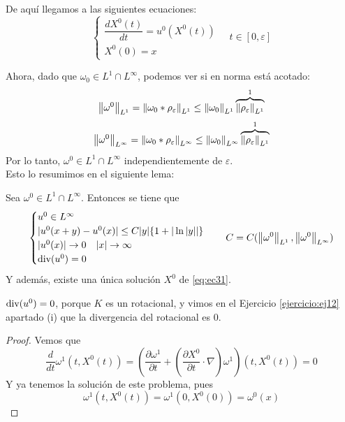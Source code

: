 De aquí llegamos a las siguientes ecuaciones:
\begin{equation}\label{eq:ec31}
    \begin{cases}
        \dfrac{d X^0(t)}{dt} = u^0(X^0(t)) \\
        X^0(0) = x
    \end{cases} \quad t \in [0,\varepsilon]
\end{equation}

Ahora, dado que $\omega_0 \in L^1 \cap L^\infty$, podemos ver si en norma está acotado:
$$\left\lVert \omega^0 \right\rVert_{L^1} = \left\lVert \omega_0 \ast \rho_\varepsilon \right\rVert_{L^1} \leq \left\lVert \omega_0 \right\rVert_{L^1} \overbrace{\left\lVert \rho_\varepsilon \right\rVert_{L^1}}^{1}$$
$$\left\lVert \omega^0 \right\rVert_{L^\infty} = \left\lVert \omega_0 \ast \rho_\varepsilon \right\rVert_{L^\infty} \leq \left\lVert \omega_0 \right\rVert_{L^\infty} 
\overbrace{\left\lVert \rho_\varepsilon \right\rVert_{L^1}}^{1}$$
Por lo tanto, $\omega^0 \in L^1 \cap L^\infty$ independientemente de $\varepsilon$. \\

Esto lo resumimos en el siguiente lema:
\begin{lema}
    Sea $\omega^0 \in L^1 \cap L^\infty$. Entonces se tiene que 
    \begin{equation*}
        \begin{cases}
            u^0 \in L^\infty \\
            |u^0(x+y) - u^0(x)| \leq C |y| \{1 + |\ln|y||\} \\
            |u^0(x)| \to 0 \quad |x| \to \infty \\
            \text{div}(u^0) = 0
        \end{cases} \quad C = C(\left\lVert \omega^0 \right\rVert_{L^1}, \left\lVert \omega^0 \right\rVert_{L^\infty})
    \end{equation*}
    Y además, existe una única solución $X^0$ de \eqref{eq:ec31}.
\end{lema}

\begin{observacion}
    $\text{div}(u^0) = 0$, porque $K$ es un rotacional, y vimos en el Ejercicio \ref{ejercicio:ej12} apartado (i) que la divergencia del rotacional es $0$.
\end{observacion}

\begin{proof}
    Vemos que 
    $$\dfrac{d}{dt} \omega^1(t, X^0(t)) = \left( \dfrac{\partial \omega^1}{\partial t} + \left( \dfrac{\partial X^0}{\partial t} \cdot \nabla \right)
    \omega^1 \right)(t, X^0(t)) = 0$$
    Y ya tenemos la solución de este problema, pues 
    $$\omega^1(t, X^0(t)) = \omega^1(0, X^0(0)) = \omega^0(x)$$
\end{proof}

